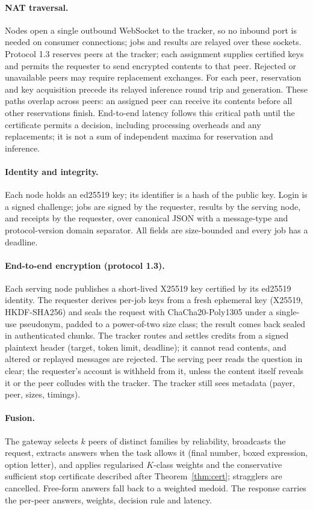 \documentclass[11pt]{article}
\theoremstyle{definition}
\theoremstyle{remark}
\begin{document}
\paragraph{NAT traversal.} Nodes open a single outbound WebSocket to the tracker, so no inbound port is
needed on consumer connections; jobs and results are relayed over these sockets. Protocol 1.3 reserves
peers at the tracker; each assignment supplies certified keys and permits the requester to send encrypted
contents to that peer. Rejected or unavailable peers may require replacement exchanges. For each peer, reservation and
key acquisition precede its relayed
inference round trip and generation. These paths overlap across peers: an assigned peer can receive its
contents before all other reservations finish. End-to-end latency follows this critical path until the
certificate permits a decision, including processing overheads and any replacements; it is not a sum of
independent maxima for reservation and inference.
\paragraph{Identity and integrity.} Each node holds an ed25519 key; its identifier is a hash of the public
key. Login is a signed challenge; jobs are signed by the requester, results by the serving node, and
receipts by the requester, over canonical JSON with a message-type and protocol-version domain separator.
All fields are size-bounded and every job has a deadline.
\paragraph{End-to-end encryption (protocol 1.3).} Each serving node publishes a short-lived X25519 key
certified by its ed25519 identity. The requester derives per-job keys from a fresh ephemeral key (X25519,
HKDF-SHA256) and seals the request with ChaCha20-Poly1305 under a single-use pseudonym, padded to a
power-of-two size class; the result comes back sealed in authenticated chunks. The tracker routes and
settles credits from a signed plaintext header (target, token limit, deadline); it cannot read contents,
and altered or replayed messages are rejected. The serving peer reads the question in clear; the
requester's account is withheld from it, unless the content itself reveals it or the peer colludes with
the tracker. The tracker still sees metadata (payer, peer, sizes, timings).
\paragraph{Fusion.} The gateway selects $k$ peers of distinct families by reliability, broadcasts the
request, extracts answers when the task allows it (final number, boxed expression, option letter), and
applies regularised $K$-class weights and the conservative sufficient stop certificate described after
Theorem~\ref{thm:cert}; stragglers are
cancelled. Free-form answers fall back to a weighted medoid. The response carries the per-peer answers,
weights, decision rule and latency.
\end{document}
